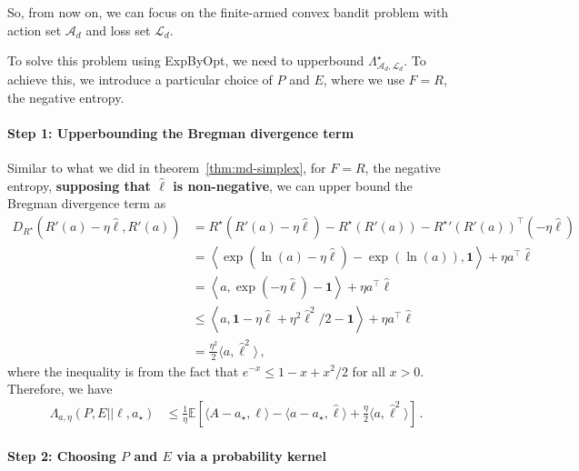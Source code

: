 \documentclass{article}
\theoremstyle{plain}
\theoremstyle{definition}
\newcommand{\E}{\mathbb E}
\newcommand{\cL}{\mathcal L}
\newcommand{\cA}{\mathcal A}
\newcommand{\expbyopt}{\textsf{ExpByOpt}\xspace}
\newcommand{\hl}{\hat{\ell}\xspace}
\begin{document}
So, from now on, we can focus on the finite-armed convex bandit problem
with action set $\cA_d$ and loss set $\cL_d$.

To solve this problem using \expbyopt, we need to upperbound $\Lambda_{\cA_d, \cL_d}^\star$.
To achieve this, we introduce a particular choice of $P$ and $E$,
where we use $F = R$, the negative entropy.

\paragraph{Step 1: Upperbounding the Bregman divergence term}
Similar to what we did in theorem~\ref{thm:md-simplex},
for $F = R$, the negative entropy,
\textbf{supposing that $\hl$ is non-negative},
we can upper bound the Bregman divergence term as
\begin{align*}
    D_{R^\star}(R'(a) - \eta \hl, R'(a))
     & =
    R^\star(R'(a) - \eta \hl) - R^\star(R'(a)) - {R^\star}'(R'(a))^\top (- \eta \hl) \\
     & =
    \left\langle
    \exp\left(
    \ln(a) - \eta \hl
    \right)
    -
    \exp(\ln(a))
    , \mathbf{1}
    \right\rangle
    + \eta a^\top \hl                                                                \\
     & =
    \left \langle
    a,
    \exp(- \eta \hl) - \mathbf{1}
    \right\rangle
    + \eta a^\top \hl                                                                \\
     & \leq
    \left\langle
    a,
    \mathbf{1} - \eta \hl + \eta^2 \hl^2/2 - \mathbf{1}
    \right\rangle
    + \eta a^\top \hl                                                                \\
     & =
    \frac{\eta^2}{2}
    \langle a, \hl^2 \rangle\,,
\end{align*}
where the inequality is from the fact that $e^{-x} \leq 1 - x + x^2/2$ for all $x > 0$.
Therefore, we have
\begin{align*}
    \Lambda_{a, \eta}(P, E || \ell, a_\star)
     & \leq
    \frac{1}{\eta}
    \E\!\left[
        \langle A - a_\star, \ell \rangle
        - \langle a - a_\star, \hl \rangle
        + \frac{\eta}{2} \langle a, \hl^2 \rangle
        \right]\,.
\end{align*}

\paragraph{Step 2: Choosing $P$ and $E$ via a probability kernel}
\end{document}
